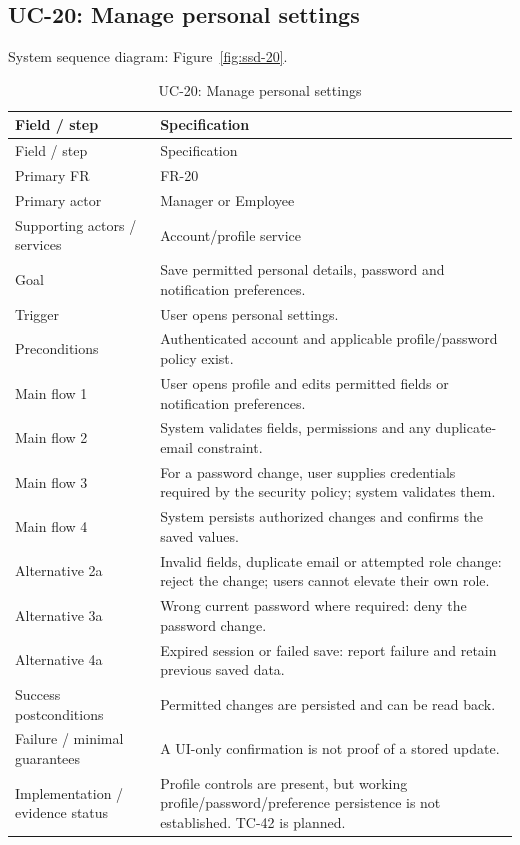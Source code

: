 \subsection*{UC-20: Manage personal settings}
\label{uc:20}
System sequence diagram: Figure~\ref{fig:ssd-20}.

\begin{longtable}{P{0.23\textwidth}P{0.67\textwidth}}
\caption{UC-20: Manage personal settings}\\
\toprule
Field / step & Specification\\
\midrule
\endfirsthead
\toprule
Field / step & Specification\\
\midrule
\endhead
Primary FR & FR-20\\
Primary actor & Manager or Employee\\
Supporting actors / services & Account/profile service\\
Goal & Save permitted personal details, password and notification preferences.\\
Trigger & User opens personal settings.\\
Preconditions & Authenticated account and applicable profile/password policy exist.\\
Main flow 1 & User opens profile and edits permitted fields or notification preferences.\\
Main flow 2 & System validates fields, permissions and any duplicate-email constraint.\\
Main flow 3 & For a password change, user supplies credentials required by the security policy; system validates them.\\
Main flow 4 & System persists authorized changes and confirms the saved values.\\
Alternative 2a & Invalid fields, duplicate email or attempted role change: reject the change; users cannot elevate their own role.\\
Alternative 3a & Wrong current password where required: deny the password change.\\
Alternative 4a & Expired session or failed save: report failure and retain previous saved data.\\
Success postconditions & Permitted changes are persisted and can be read back.\\
Failure / minimal guarantees & A UI-only confirmation is not proof of a stored update.\\
Implementation / evidence status & Profile controls are present, but working profile/password/preference persistence is not established. TC-42 is planned.\\
\bottomrule
\end{longtable}

